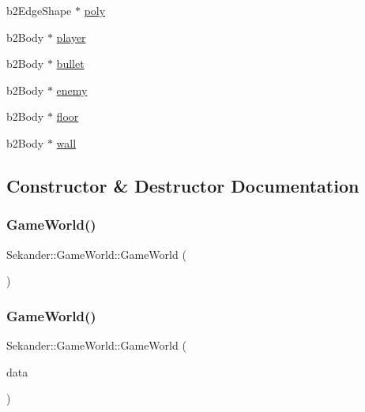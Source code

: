 \begin{DoxyCompactItemize}
\item 
b2\+Edge\+Shape $\ast$ \hyperlink{classSekander_1_1GameWorld_a3efbbb851ccda6cc754ae5a567a6215a}{poly}
\item 
b2\+Body $\ast$ \hyperlink{classSekander_1_1GameWorld_a2ceefac22fc6906e1522abf7ca0be576}{player}
\item 
b2\+Body $\ast$ \hyperlink{classSekander_1_1GameWorld_ad95a5d205f8b25013916ceec88710042}{bullet}
\item 
b2\+Body $\ast$ \hyperlink{classSekander_1_1GameWorld_ae9290e904834fca5fa209a6bddb53bd6}{enemy}
\item 
b2\+Body $\ast$ \hyperlink{classSekander_1_1GameWorld_a9267f9cb0e1678b46196ab8bef1de654}{floor}
\item 
b2\+Body $\ast$ \hyperlink{classSekander_1_1GameWorld_a0a67f9a7d37aa2aaa03e1a66a46119e8}{wall}
\end{DoxyCompactItemize}


\subsection{Constructor \& Destructor Documentation}
\mbox{\label{classSekander_1_1GameWorld_a4eba015ae47c7e54c545a874906be1c1}} 
\subsubsection{\texorpdfstring{Game\+World()}{GameWorld()}\hspace{0.1cm}{\footnotesize\ttfamily [1/3]}}
{\footnotesize\ttfamily Sekander\+::\+Game\+World\+::\+Game\+World (\begin{DoxyParamCaption}{ }\end{DoxyParamCaption})}

\mbox{\label{classSekander_1_1GameWorld_a3d57a6627443dcb871f2cc44dd8c5be6}} 
\subsubsection{\texorpdfstring{Game\+World()}{GameWorld()}\hspace{0.1cm}{\footnotesize\ttfamily [2/3]}}
{\footnotesize\ttfamily Sekander\+::\+Game\+World\+::\+Game\+World (\begin{DoxyParamCaption}\item[{\hyperlink{namespaceSekander_a1d69b002ba2d23020901c28f0def5e16}{Game\+Data\+Ref}}]{data }\end{DoxyParamCaption})}

